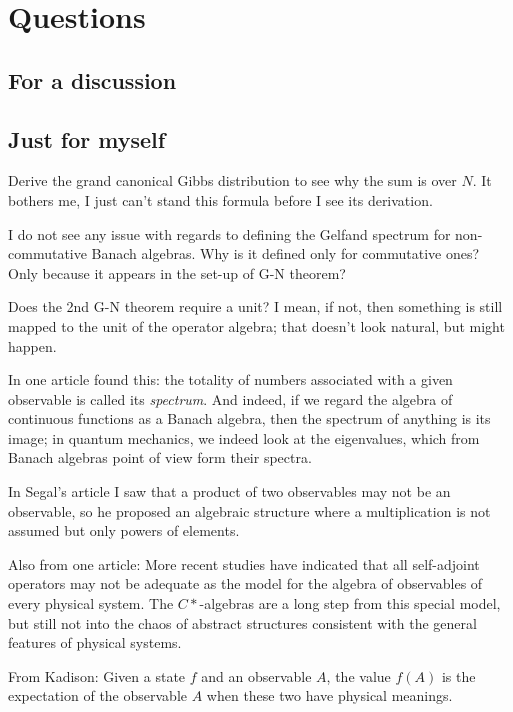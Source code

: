 \section{Questions}
\subsection{For a discussion}
\subsection{Just for myself}
\begin{quest}
Derive the grand canonical Gibbs distribution to see why the sum is over $N$. It bothers me, I just can't stand this formula before I see its derivation.
\end{quest}
\begin{quest}
I do not see any issue with regards to defining the Gelfand spectrum for non-commutative Banach algebras. Why is it defined only for commutative ones? Only because it appears in the set-up of G-N theorem?
\end{quest}
\begin{quest}
Does the 2nd G-N theorem require a unit? I mean, if not, then something is still mapped to the unit of the operator algebra; that doesn't look natural, but might happen.
\end{quest}

In one article found this: the totality of numbers associated with a given observable is called its \emph{spectrum}. And indeed, if we regard the algebra of continuous functions as a Banach algebra, then the spectrum of anything is its image; in quantum mechanics, we indeed look at the eigenvalues, which from Banach algebras point of view form their spectra.

In Segal's article I saw that a product of two observables may not be an observable, so he proposed an algebraic structure where a multiplication is not assumed but only powers of elements.

Also from one article:
More recent studies have indicated that all self-adjoint operators may not be adequate as the model for the algebra of observables of every physical system. The $C*$-algebras are a long step from this special model, but still not into the chaos of abstract structures consistent with the general features of physical systems. 

From Kadison:
Given a state $f$ and an observable $A$, the value $f(A)$ is the expectation of the observable $A$ when these two have physical meanings.